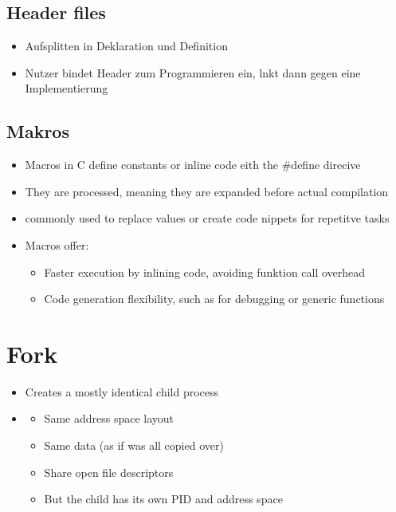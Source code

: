 \documentclass{kit}
\begin{document}
  \subsection{Header files}
    \begin{itemize}
      \item Aufsplitten in Deklaration und Definition
      \item Nutzer bindet Header zum Programmieren ein, lnkt dann gegen eine Implementierung
    \end{itemize}
  \subsection{Makros}
    \begin{itemize}
      \item Macros in C define constants or inline code eith the \#define direcive
      \item They are processed, meaning they are expanded before actual compilation
      \item commonly used to replace values or create code nippets for repetitve tasks
      \item Macros offer:
        \begin{itemize}
          \item Faster execution by inlining code, avoiding funktion call overhead
          \item Code generation flexibility, such as for debugging or generic functions
        \end{itemize}
    \end{itemize}


\section{Fork}
  \begin{itemize}
    \item Creates a mostly identical child process
    \item \begin{itemize}
        \item Same address space layout
        \item Same data (as if was all copied over)
        \item Share open file descriptors
        \item But the child has its own PID and address space
    \end{itemize}
  \end{itemize}
  \newpage
\end{document}
